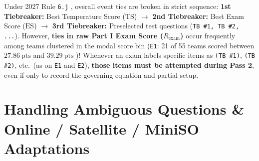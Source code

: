 \begin{trapbox}
Under 2027 Rule \texttt{6.j} , overall event ties are broken in strict sequence:
\textbf{1st Tiebreaker:} Best Temperature Score ($\mathrm{TS}$) $\longrightarrow$ \textbf{2nd Tiebreaker:} Best Exam Score ($\mathrm{ES}$) $\longrightarrow$ \textbf{3rd Tiebreaker:} Preselected test questions (\texttt{TB \#1, TB \#2, ...}).
However, \textbf{ties in raw Part I Exam Score ($R_{\mathrm{exam}}$)} occur frequently among teams clustered in the modal score bin (\texttt{E1}: 21 of 55 teams scored between $\SI{27.86}{\text{pts}}$ and $\SI{39.29}{\text{pts}}$ )! Whenever an exam labels specific items as \texttt{(TB \#1)}, \texttt{(TB \#2)}, etc.\ (as on \texttt{E1} and \texttt{E2}), \textbf{those items must be attempted during Pass 2}, even if only to record the governing equation and partial setup.
\end{trapbox}

\section{Handling Ambiguous Questions \& Online / Satellite / MiniSO Adaptations}\label{sec:21.5}


